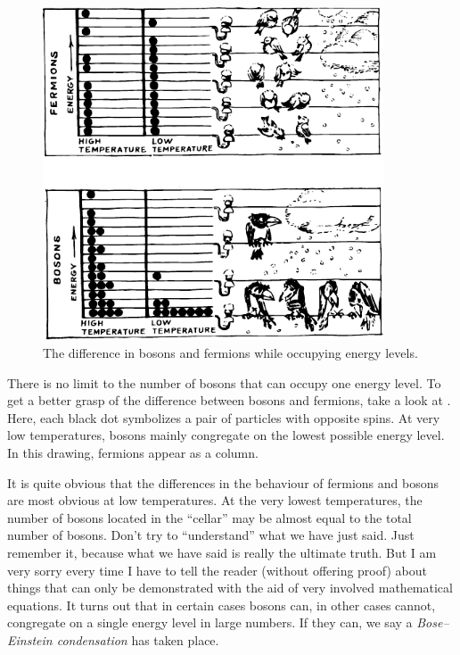 \begin{figure}[!ht]
\centering
\includegraphics[width=0.9\textwidth]{figures/fig-05-04.pdf}
\caption{The difference in bosons and fermions while occupying energy levels.}
\label{fig-5.4}
\end{figure}

There is no limit to the number of bosons that can occupy one energy level. To get a better grasp of the difference between bosons and fermions, take a look at . Here, each black dot symbolizes a pair of particles with opposite spins. At very low temperatures, bosons mainly congregate on the lowest possible energy level. In this drawing, fermions appear as a column.

It is quite obvious that the differences in the behaviour of fermions and bosons are most obvious at low tempera­tures. At the very lowest temperatures, the number of bosons located in the ``cellar'' may be almost equal to the total number of bosons.
Don’t try to ``understand'' what we have just said. Just remember it, because what we have said is really the ultimate truth. But I am very sorry every time I have to tell the reader (without offering proof) about things that can only be demonstrated with the aid of very in­volved mathematical equations. It turns out that in cer­tain cases bosons can, in other cases cannot, congregate on a single energy level in large numbers. If they can, we say a \emph{Bose--Einstein condensation} has taken place.

